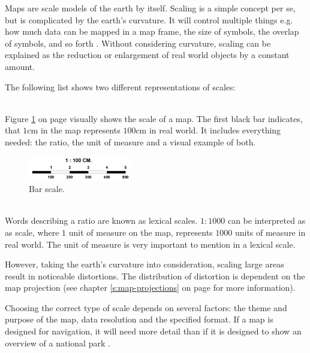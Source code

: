 Maps are scale models of the earth by itself. Scaling is a simple concept per se, but is complicated by the earth's curvature. It will control multiple things e.g. how much data can be mapped in a map frame, the size of symbols, the overlap of symbols, and so forth . Without considering curvature, scaling can be explained as the reduction or enlargement of real world objects by a constant amount.

The following list shows two different representations of scales:
\begin{enumerate}
 \hfill \\
Figure \ref{fig:bar-scale} on page \pageref{fig:bar-scale} visually shows the scale of a map. The first black bar indicates, that $1$cm in the map represents $100$cm in real world. It includes everything needed: the ratio, the unit of measure and a visual example of both.

\begin{figure}[!htb]
\centering
\includegraphics[width=0.4\textwidth,keepaspectratio]{images/methods/scalebar.jpg}
\caption[
    Bar scale.
]{Bar scale.}
\label{fig:bar-scale}
\end{figure}

 \hfill \\
Words describing a ratio are known as lexical scales. $1:1000$ can be interpreted as as scale, where $1$ unit of measure on the map, represents $1000$ units of measure in real world. The unit of measure is very important to mention in a lexical scale.
\end{enumerate}

However, taking the earth's curvature into consideration, scaling large areas result in noticeable distortions. The distribution of distortion is dependent on the map projection (see chapter \ref{s:map-projections} on page \pageref{s:map-projections} for more information).

Choosing the correct type of scale depends on several factors: the theme and purpose of the map, data resolution and the specified format. If a map is designed for navigation, it will need more detail than if it is designed to show an overview of a national park .
